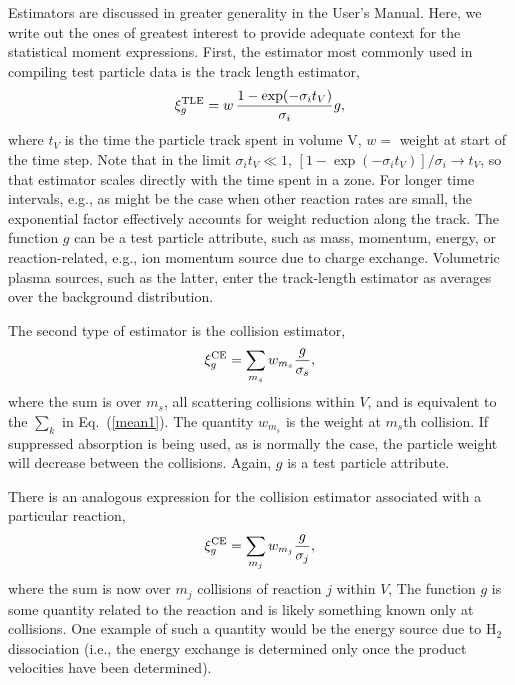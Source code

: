 \documentclass[12pt]{report}
\begin{document}
Estimators are discussed in greater generality in the
User's Manual.  Here, we write out the ones of
greatest interest to provide adequate context
for the statistical moment expressions.
First, the estimator most commonly used in compiling
test particle data is the track length estimator, 
\begin{equation}
\xi_{g}^{\rm TLE} = w \, \frac{1 - \exp(-\sigma_{i} t_{V})}{\sigma_{i}} g,
\label{TLE}
\end{equation}
where  $t_{V}$ is the time the particle track spent in volume V,
$w =$ weight at start of the time step.  Note that in the
limit $\sigma_{i} t_{V} \ll 1$,
$[1 - \exp(-\sigma_{i} t_{V})]/\sigma_{i} \rightarrow t_{V}$,
so that estimator scales directly with the time spent in a zone.
For longer time intervals, e.g., as might be the case when other
reaction rates are small, 
the exponential factor effectively accounts for weight reduction
along the track.
The function $g$ can be a test particle attribute, such as
mass, momentum, energy, or reaction-related, e.g., ion 
momentum source due to charge exchange. Volumetric
plasma sources, such as the latter, 
enter the track-length estimator as averages over the background 
distribution.

The second type of estimator is the collision estimator,
\begin{equation}
\xi_{g}^{\rm CE} = \sum_{m_{s}} w_{m_{s}} 
\frac{g}{\sigma_{s}},
\label{ce}
\end{equation}
where the sum is over $m_{s}$, all scattering collisions within $V$,
and is equivalent to the $\sum_{k}$ in Eq.~(\ref{mean1}).
The quantity $w_{m_{s}}$ is the weight at $m_{s}$th collision.  If
suppressed absorption is being used, as is normally the case, the
particle weight will decrease between the collisions.
Again, $g$ is a test particle attribute.

There is an analogous expression for the collision estimator associated
with a particular reaction,
\begin{equation}
\xi_{g}^{\rm CE} = \sum_{m_{j}} w_{m_{j}} \frac{g}{\sigma_{j}},
\label{cereac}
\end{equation}
where the sum is now over $m_{j}$ collisions of reaction $j$ within $V$,
The function $g$ is some quantity related to the reaction and is likely
something known only at collisions. One example of such a quantity would
be the energy source due to H$_{2}$ dissociation (i.e., the energy
exchange is determined only once the product velocities have been 
determined).
\end{document}
